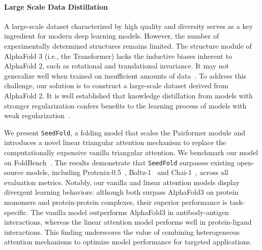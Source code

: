 \paragraph{Large Scale Data Distillation} A large-scale dataset characterized by high quality and diversity serves as a key ingredient for modern deep learning models. However, the number of experimentally determined structures remains limited. The structure module of AlphaFold 3 (i.e., the Transformer) lacks the inductive biases inherent to AlphaFold 2, such as rotational and translational invariance. It may not generalize well when trained on insufficient amounts of data~\cite{dosovitskiy2020image}. To address this challenge, our solution is to construct a large-scale dataset derived from AlphaFold 2. It is well established that knowledge distillation from models with stronger regularization confers benefits to the learning process of models with weak regularization~\cite{gu2017non}.

We present \texttt{SeedFold}, a folding model that scales the Pairformer module and introduces a novel linear triangular attention mechanism to replace the computationally expensive vanilla triangular attention. We benchmark our model on FoldBench~\cite{xu2025benchmarking}. The results demonstrate that \texttt{SeedFold} surpasses existing open-source models, including Protenix-0.5~\cite{bytedance2025protenix}, Boltz-1~\cite{passaro2025boltz} and Chai-1~\cite{chai2024chai}, across all evaluation metrics. 
Notably, our vanilla and linear attention models display divergent learning behaviors: although both surpass AlphaFold3 on protein monomers and protein-protein complexes, their superior performance is task-specific. The vanilla model outperforms AlphaFold3 in antibody-antigen interactions, whereas the linear attention model performs well in protein-ligand interactions. This finding underscores the value of combining heterogeneous attention mechanisms to optimize model performance for targeted applications.

